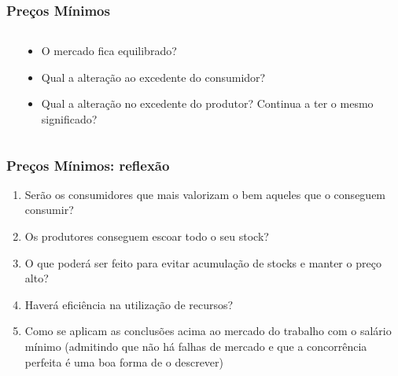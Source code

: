 \begin{frame}
	\frametitle{Pre\c cos M\'inimos}
	\begin{columns}
		\begin{column}{0.6\textwidth}
			\begin{center}
			\end{center}
		\end{column}
		\begin{column}{0.4\textwidth}
			\begin{itemize}
				\item O mercado fica equilibrado?
				\item Qual a altera\c c\~ao ao excedente do consumidor?
				\item Qual a altera\c c\~ao no excedente do produtor? Continua a ter o mesmo significado?
			\end{itemize}
		\end{column}
	\end{columns}
\end{frame}

\begin{frame}
	\frametitle{Pre\c cos M\'inimos: reflex\~ao}
	\begin{enumerate}
		\item Ser\~ao os consumidores que mais valorizam o bem aqueles que o conseguem consumir?
		\item Os produtores conseguem escoar todo o seu stock?
		\item O que poder\'a ser feito para evitar acumula\c c\~ao de stocks e manter o pre\c co alto?
		\item Haver\'a efici\^encia na utiliza\c c\~ao de recursos?
		\item Como se aplicam as conclus\~oes acima ao mercado do trabalho com o sal\'ario m\'inimo (admitindo que n\~ao h\'a falhas de mercado e que a concorr\^encia perfeita \'e uma boa forma de o descrever)
	\end{enumerate}
\end{frame}